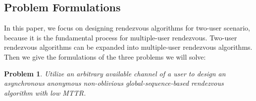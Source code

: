 \documentclass[10pt, conference, letterpaper]{IEEEtran}
\newtheorem{problem}{Problem}
\begin{document}
%
%
%

\subsection{Problem Formulations}
In this paper, we focus on designing rendezvous algorithms for two-user scenario, because it is the fundamental process for multiple-user rendezvous. Two-user rendezvous algorithms can be expanded into multiple-user rendezvous algorithms. Then we give the formulations of the three problems we will solve:
\begin{problem}
Utilize an arbitrary available channel of a user to design an asynchronous anonymous non-oblivious global-sequence-based rendezvous algorithm with low MTTR.
\end{problem}
\end{document}
